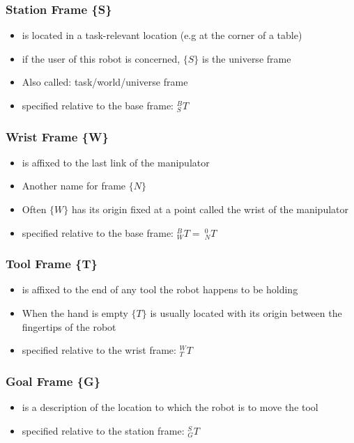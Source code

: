 \documentclass[10pt,a4paper]{article}
\begin{document}
\subsubsection{Station Frame \{S\}}
\begin{itemize}
	\item is located in a task-relevant location (e.g at the corner of a table)
	\item if the user of this robot is concerned, $\{S\}$ is the universe frame
	\item Also called: task/world/universe frame
	\item specified relative to the base frame: $^B_ST$
\end{itemize}

\subsubsection{Wrist Frame \{W\}}
\begin{itemize}
	\item is affixed to the last link of the manipulator
	\item Another name for frame $\{N\}$
	\item Often $\{W\}$ has its origin fixed at a point called the wrist of the manipulator
	\item specified relative to the base frame: $^B_WT = ~^0_NT$ 
\end{itemize}
\subsubsection{Tool Frame \{T\}}
\begin{itemize}
	\item is affixed to the end of any tool the robot happens to be holding
	\item When the hand is empty $\{T\}$ is usually located with its origin between the fingertips of the robot
	\item specified relative to the wrist frame: $^W_TT$
\end{itemize}
\subsubsection{Goal Frame \{G\}}
\begin{itemize}
	\item is a description of the location to which the robot is to move the tool
	\item specified relative to the station frame: $^S_GT$
\end{itemize}
\end{document}

